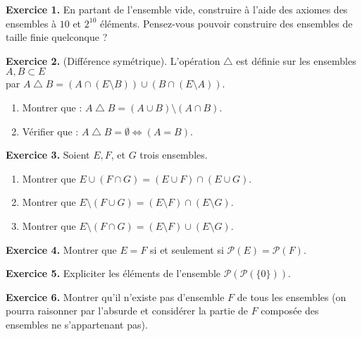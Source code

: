 \documentclass[a4paper, 10pt]{report}
\begin{document}
	
	\renewcommand{\headrule}{%
		\vspace{-4pt}\hrulefill
		\raisebox{-6.8pt}{\ \texttt{[image: ../../icon.png]}}
		\hrulefill
	}	
	\pagestyle{fancy}
	\fancyhf{}
	
	
	\noindent
	\textbf{Exercice 1.} En partant de l'ensemble vide, construire à
	l'aide des axiomes des ensembles à $10$ et $2^{10}$ éléments.
	Pensez-vous pouvoir construire des ensembles de taille finie
	quelconque ?
	
	\vspace{5mm}
	\noindent
	\textbf{Exercice 2.} (Différence symétrique). L'opération
	$\bigtriangleup$ est définie sur les ensembles $A, B \subset E$\\
	par $A \bigtriangleup B =
		(A \cap (E \setminus B)) \cup (B \cap (E \setminus A))$.
	
	\begin{enumerate}[label=\arabic*.]
		\item Montrer que : $A \bigtriangleup B =
			(A \cup B) \setminus (A \cap B)$.
		\item Vérifier que : $A \bigtriangleup B = \emptyset
			\iff (A = B)$.
	\end{enumerate}
	
	\vspace{5mm}
	\noindent
	\textbf{Exercice 3.} Soient $E, F$, et $G$ trois ensembles.
	
	\begin{enumerate}[label=\arabic*.]
		\item Montrer que $E \cup (F \cap G)
			= (E \cup F) \cap (E \cup G)$.
		\item Montrer que $E \setminus (F \cup G)
			= (E \setminus F) \cap (E \setminus G)$.
		\item Montrer que $E \setminus (F \cap G)
		= (E \setminus F) \cup (E \setminus G)$.
	\end{enumerate}
	
	\vspace{5mm}
	\noindent
	\textbf{Exercice 4.} Montrer que $E = F$ si et seulement si
	$\mathcal{P}(E) = \mathcal{P}(F)$.
	
	\vspace{5mm}
	\noindent
	\textbf{Exercice 5.} Expliciter les éléments de l'ensemble
	$\mathcal{P}(\mathcal{P}(\{0\}))$.
	
	\vspace{5mm}
	\noindent
	{\color{red}\textbf{Exercice 6.}}
	Montrer qu'il n'existe pas d'ensemble $F$ de tous les ensembles
	(on pourra raisonner par l'absurde et considérer la partie de $F$
	composée des ensembles ne s'appartenant pas).	
\end{document}
